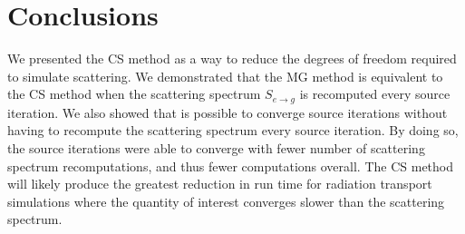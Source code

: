 \documentclass{anstrans}
\begin{document}
\section{Conclusions}
We presented the CS method as a way to reduce the degrees of freedom required to simulate scattering. We demonstrated that the MG method is equivalent to the CS method when the scattering spectrum $S_{e \to g}$ is recomputed every source iteration. We also showed that is possible to converge source iterations without having to recompute the scattering spectrum every source iteration. By doing so, the source iterations were able to converge with fewer number of scattering spectrum recomputations, and thus fewer computations overall. The CS method will likely produce the greatest reduction in run time for radiation transport simulations where the quantity of interest converges slower than the scattering spectrum. 



\end{document}

